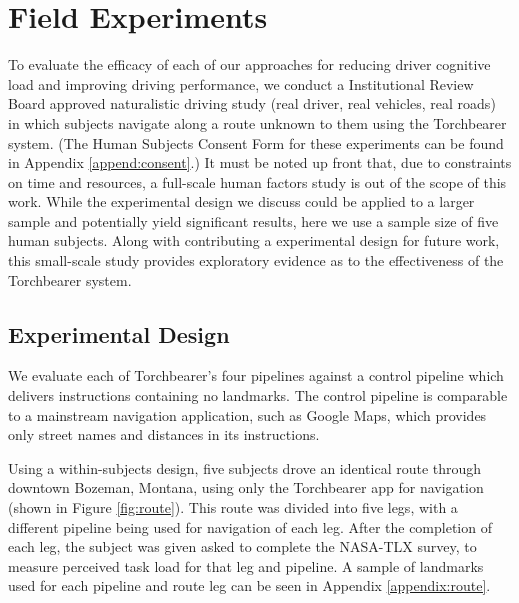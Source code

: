 \fi

\section{Field Experiments}

To evaluate the efficacy of each of our approaches for reducing driver cognitive load and improving driving performance, we conduct a Institutional Review Board approved naturalistic driving study (real driver, real vehicles, real roads) in which subjects navigate along a route unknown to them using the Torchbearer system. (The Human Subjects Consent Form for these experiments can be found in Appendix \ref{append:consent}.) It must be noted up front that, due to constraints on time and resources, a full-scale human factors study is out of the scope of this work. While the experimental design we discuss could be applied to a larger sample and potentially yield significant results, here we use a sample size of five human subjects. Along with contributing a experimental design for future work, this small-scale study provides exploratory evidence as to the effectiveness of the Torchbearer system.

\subsection{Experimental Design}

We evaluate each of Torchbearer's four pipelines against a control pipeline which delivers instructions containing no landmarks. The control pipeline is comparable to a mainstream navigation application, such as Google Maps, which provides only street names and distances in its instructions.

Using a within-subjects design, five subjects drove an identical route through downtown Bozeman, Montana, using only the Torchbearer app for navigation (shown in Figure \ref{fig:route}). This route was divided into five legs, with a different pipeline being used for navigation of each leg. After the completion of each leg, the subject was given asked to complete the NASA-TLX survey, to measure perceived task load for that leg and pipeline. A sample of landmarks used for each pipeline and route leg can be seen in Appendix \ref{appendix:route}.


